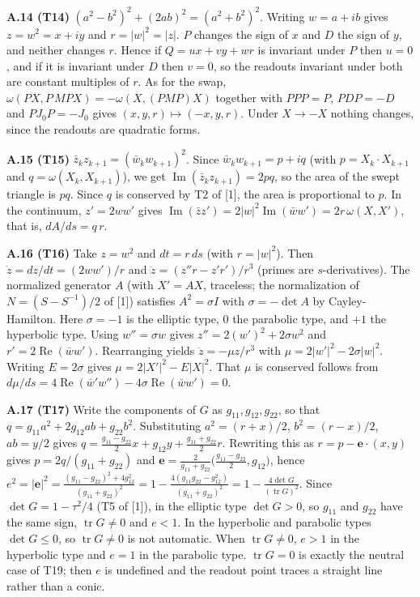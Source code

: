 \documentclass[
  a4paper,
]{article}
\begin{document}
\textbf{A.14 (T14)} \((a^2-b^2)^2+(2ab)^2=(a^2+b^2)^2\). Writing
\(w=a+ib\) gives \(z=w^2=x+iy\) and
\(r=\lvert w\rvert^2=\lvert z\rvert\). \(P\) changes the sign of \(x\)
and \(D\) the sign of \(y\), and neither changes \(r\). Hence if
\(Q=ux+vy+wr\) is invariant under \(P\) then \(u=0\), and if it is
invariant under \(D\) then \(v=0\), so the readouts invariant under both
are constant multiples of \(r\). As for the swap,
\(\omega(PX,P\,MPX)=-\omega(X,(PMP)X)\) together with \(PPP=P\),
\(PDP=-D\) and \(PJ_0P=-J_0\) gives \((x,y,r)\mapsto(-x,y,r)\). Under
\(X\to-X\) nothing changes, since the readouts are quadratic forms.

\textbf{A.15 (T15)} \(\bar z_kz_{k+1}=(\bar w_kw_{k+1})^2\). Since
\(\bar w_kw_{k+1}=p+iq\) (with \(p=X_k\cdot X_{k+1}\) and
\(q=\omega(X_k,X_{k+1})\)), we get
\(\operatorname{Im}(\bar z_kz_{k+1})=2pq\), so the area of the swept
triangle is \(pq\). Since \(q\) is conserved by T2 of {[}1{]}, the area
is proportional to \(p\). In the continuum, \(z'=2ww'\) gives
\(\operatorname{Im}(\bar zz')=2\lvert w\rvert^2\operatorname{Im}(\bar ww')=2r\,\omega(X,X')\),
that is, \(dA/ds=q\,r\).

\textbf{A.16 (T16)} Take \(z=w^2\) and \(dt=r\,ds\) (with
\(r=\lvert w\rvert^2\)). Then \(\dot z=dz/dt=(2ww')/r\) and
\(\ddot z=(z''r-z'r')/r^3\) (primes are \(s\)-derivatives). The
normalized generator \(A\) (with \(X'=AX\), traceless; the normalization
of \(N=(S-S^{-1})/2\) of {[}1{]}) satisfies \(A^2=\sigma I\) with
\(\sigma=-\det A\) by Cayley-Hamilton. Here \(\sigma=-1\) is the
elliptic type, \(0\) the parabolic type, and \(+1\) the hyperbolic type.
Using \(w''=\sigma w\) gives \(z''=2(w')^2+2\sigma w^2\) and
\(r'=2\operatorname{Re}(\bar ww')\). Rearranging yields
\(\ddot z=-\mu z/r^3\) with
\(\mu=2\lvert w'\rvert^2-2\sigma\lvert w\rvert^2\). Writing
\(E=2\sigma\) gives \(\mu=2\lvert X'\rvert^2-E\lvert X\rvert^2\). That
\(\mu\) is conserved follows from
\(d\mu/ds=4\operatorname{Re}(\bar w'w'')-4\sigma\operatorname{Re}(\bar ww')=0\).

\textbf{A.17 (T17)} Write the components of \(G\) as
\(g_{11},g_{12},g_{22}\), so that \(q=g_{11}a^2+2g_{12}ab+g_{22}b^2\).
Substituting \(a^2=(r+x)/2\), \(b^2=(r-x)/2\), \(ab=y/2\) gives
\(q=\frac{g_{11}-g_{22}}{2}x+g_{12}y+\frac{g_{11}+g_{22}}{2}r\).
Rewriting this as \(r=p-\mathbf e\cdot(x,y)\) gives
\(p=2q/(g_{11}+g_{22})\) and
\(\mathbf e=\frac{2}{g_{11}+g_{22}}\bigl(\frac{g_{11}-g_{22}}{2},g_{12}\bigr)\),
hence
\(e^2=\lvert\mathbf e\rvert^2=\frac{(g_{11}-g_{22})^2+4g_{12}^2}{(g_{11}+g_{22})^2}=1-\frac{4(g_{11}g_{22}-g_{12}^2)}{(g_{11}+g_{22})^2}=1-\frac{4\det G}{(\operatorname{tr}G)^2}\).
Since \(\det G=1-\tau^2/4\) (T5 of {[}1{]}), in the elliptic type
\(\det G>0\), so \(g_{11}\) and \(g_{22}\) have the same sign,
\(\operatorname{tr}G\neq0\) and \(e<1\). In the hyperbolic and parabolic
types \(\det G\le0\), so \(\operatorname{tr}G\neq0\) is not automatic.
When \(\operatorname{tr}G\neq0\), \(e>1\) in the hyperbolic type and
\(e=1\) in the parabolic type. \(\operatorname{tr}G=0\) is exactly the
neutral case of T19; then \(e\) is undefined and the readout point
traces a straight line rather than a conic.
\end{document}
